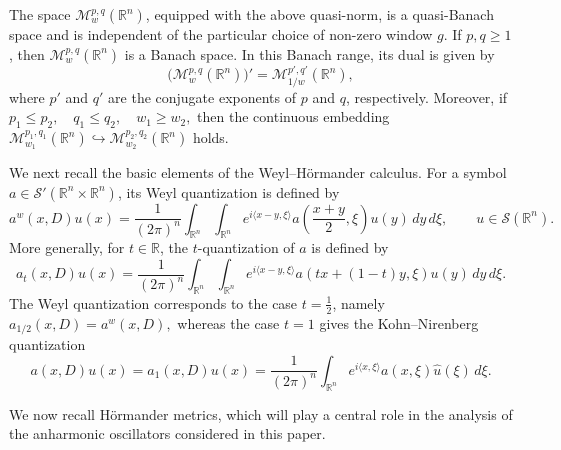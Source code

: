 \documentclass[12pt, reqno]{amsart}
\theoremstyle{definition}
\theoremstyle{remark}
\numberwithin{equation}{section}
\begin{document}
The space $\mathcal M_w^{p,q}(\mathbb R^n)$, equipped with the above quasi-norm, is a quasi-Banach space and is independent of the particular choice of non-zero window $g$. If $p,q\geq 1$, then $\mathcal M_w^{p,q}(\mathbb R^n)$ is a Banach space. In this Banach range, its dual is given by
\[
    \big(\mathcal M_w^{p,q}(\mathbb R^n)\big)'
    =
    \mathcal M_{1/w}^{p',q'}(\mathbb R^n),
\]
where $p'$ and $q'$ are the conjugate exponents of $p$ and $q$, respectively. Moreover, if $p_1\leq p_2,\quad q_1\leq q_2,\quad w_1\geq w_2,$
then the continuous embedding $  \mathcal M_{w_1}^{p_1,q_1}(\mathbb R^n)
    \hookrightarrow
    \mathcal M_{w_2}^{p_2,q_2}(\mathbb R^n)$
holds.

We next recall the basic elements of the Weyl--H\"ormander calculus. For a symbol
$a\in\mathcal S'(\mathbb R^n\times\mathbb R^n)$, its Weyl quantization is defined by
\[
    a^w(x,D)u(x)
    =
    \frac{1}{(2\pi)^n}
    \int_{\mathbb R^n}\int_{\mathbb R^n}
    e^{i\langle x-y,\xi\rangle}
    a\left(\frac{x+y}{2},\xi\right)
    u(y)\,dy\,d\xi ,
    \qquad u\in\mathcal S(\mathbb R^n).
\]
More generally, for $t\in\mathbb R$, the $t$-quantization of $a$ is defined by
\[
    a_t(x,D)u(x)
    =
    \frac{1}{(2\pi)^n}
    \int_{\mathbb R^n}\int_{\mathbb R^n}
    e^{i\langle x-y,\xi\rangle}
    a(tx+(1-t)y,\xi)
    u(y)\,dy\,d\xi .
\]
The Weyl quantization corresponds to the case $t=\frac12$, namely $a_{1/2}(x,D)=a^w(x,D),$
whereas the case $t=1$ gives the Kohn--Nirenberg quantization
\[
    a(x,D)u(x)
    =
    a_1(x,D)u(x)
    =
    \frac{1}{(2\pi)^n}
    \int_{\mathbb R^n}
    e^{i\langle x,\xi\rangle}
    a(x,\xi)\widehat u(\xi)\,d\xi .
\]

We now recall H\"ormander metrics, which will play a central role in the analysis of the anharmonic oscillators considered in this paper.
\end{document}
